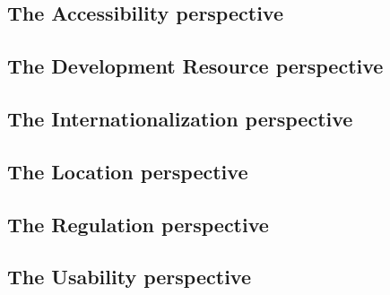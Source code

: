 \subsection*{The Accessibility perspective}

\subsection*{The Development Resource perspective}

\subsection*{The Internationalization perspective}

\subsection*{The Location perspective}

\subsection*{The Regulation perspective}

\subsection*{The Usability perspective}

